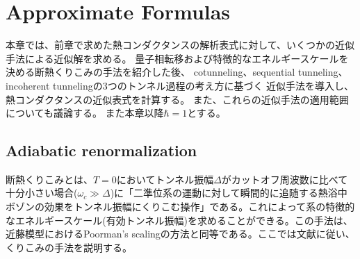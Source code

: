\section{Approximate Formulas}

本章では、前章で求めた熱コンダクタンスの解析表式に対して、いくつかの近似手法による近似解を求める。
量子相転移および特徴的なエネルギースケールを決める断熱くりこみの手法を紹介した後、
cotunneling、sequential tunneling、incoherent tunnelingの3つのトンネル過程の考え方に基づく
近似手法を導入し、熱コンダクタンスの近似表式を計算する。
また、これらの近似手法の適用範囲についても議論する。
また本章以降$\hbar=1$とする。

\subsection{Adiabatic renormalization}

断熱くりこみとは、$T=0$においてトンネル振幅$\Delta$がカットオフ周波数に比べて十分小さい場合($\omega_c\gg\Delta$)に「二準位系の運動に対して瞬間的に追随する熱浴中ボゾンの効果をトンネル振幅にくりこむ操作」である。これによって系の特徴的なエネルギースケール(有効トンネル振幅)を求めることができる。この手法は、近藤模型におけるPoorman's scalingの方法と同等である。ここでは文献\cite{Leggett87}に従い、くりこみの手法を説明する。

